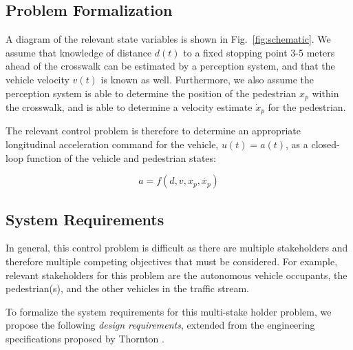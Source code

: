 \documentclass[letterpaper, 10 pt, conference]{ieeeconf}  %
\begin{document}
\subsection{Problem Formalization}
\label{sec:probform}

A diagram of the relevant state variables is shown in Fig.~\ref{fig:schematic}. We assume that knowledge of distance $d(t)$ to a fixed stopping point 3-5 meters ahead of the crosswalk can be estimated by a perception system, and that the vehicle velocity $v(t)$ is known as well. Furthermore, we also assume the perception system is able to determine the position of the pedestrian $x_p$ within the crosswalk, and is able to determine a velocity estimate $\dot{x}_p$ for the pedestrian. 


The relevant control problem is therefore to determine an appropriate longitudinal acceleration command for the vehicle, $u(t) = a(t)$, as a closed-loop function of the vehicle and pedestrian states:

\begin{equation}
a = f(d, v, x_p, \dot{x_p})
\end{equation}



\subsection{System Requirements}

In general, this control problem is difficult as there are multiple stakeholders and therefore multiple competing objectives that must be considered. For example, relevant stakeholders for this problem are the autonomous vehicle occupants, the pedestrian(s), and the other vehicles in the traffic stream. 

To formalize the system requirements for this multi-stake holder problem, we propose the following \textit{design requirements}, extended from the engineering specifications proposed by Thornton \cite{Thornton2018}. 
\end{document}
